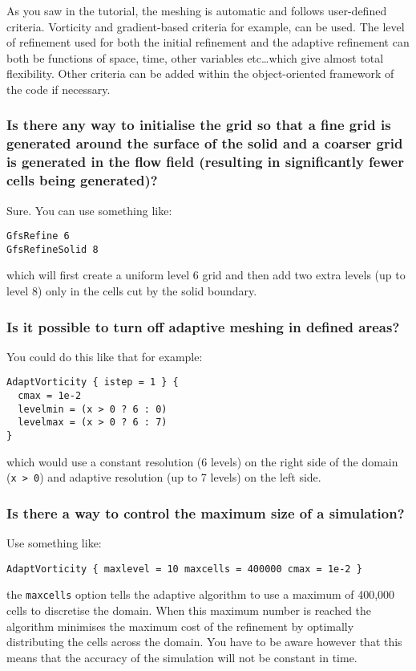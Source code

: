 \documentclass[a4paper]{article}
\begin{document}
As you saw in the tutorial, the meshing is automatic and follows
user-defined criteria. Vorticity and gradient-based criteria for
example, can be used. The level of refinement used for both the
initial refinement and the adaptive refinement can both be functions
of space, time, other variables etc\dots which give almost total
flexibility. Other criteria can be added within the object-oriented
framework of the code if necessary.

\subsubsection{Is there any way to initialise the grid so that a fine grid is generated 
around the surface of the solid and a coarser grid is generated in the flow 
field (resulting in significantly fewer cells being generated)?}

Sure. You can use something like:
\begin{verbatim}
GfsRefine 6
GfsRefineSolid 8
\end{verbatim}
which will first create a uniform level 6 grid and then add two extra
levels (up to level 8) only in the cells cut by the solid boundary.

\subsubsection{Is it possible to turn off  adaptive meshing in defined areas?}

You could do this like that for example:
\begin{verbatim}
AdaptVorticity { istep = 1 } { 
  cmax = 1e-2 
  levelmin = (x > 0 ? 6 : 0)
  levelmax = (x > 0 ? 6 : 7)
}
\end{verbatim}
which would use a constant resolution (6 levels) on the right side of
the domain ({\tt x > 0}) and adaptive resolution (up to 7 levels) on
the left side.

\subsubsection{Is there a way to control the maximum size of a simulation?}

Use something like:
\begin{verbatim}
AdaptVorticity { maxlevel = 10 maxcells = 400000 cmax = 1e-2 }
\end{verbatim}
the {\tt maxcells} option tells the adaptive algorithm to use a maximum of
400,000 cells to discretise the domain. When this maximum number is
reached the algorithm minimises the maximum cost of the refinement by
optimally distributing the cells across the domain. You have to be
aware however that this means that the accuracy of the simulation will
not be constant in time.
\end{document}
